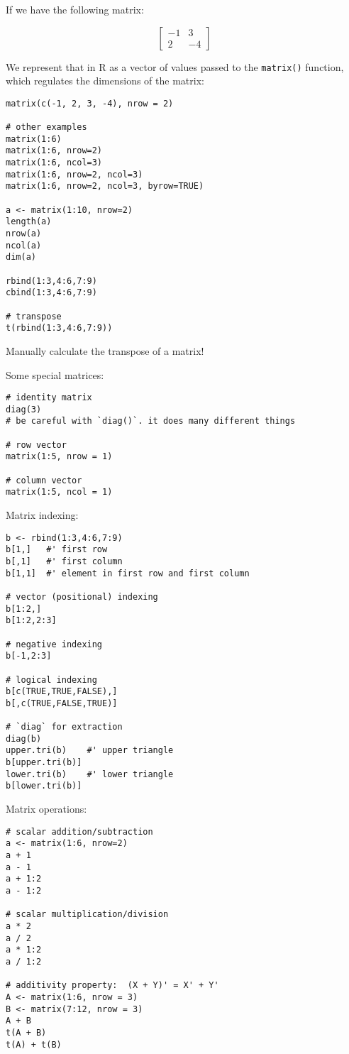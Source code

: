 \documentclass[a4paper,12pt]{article}
\begin{document}
If we have the following matrix:

\begin{equation}
\begin{bmatrix}
  -1 & 3 \\
  2 & -4
\end{bmatrix}
\end{equation}


We represent that in R as a vector of values passed to the \texttt{matrix()} function, which regulates the dimensions of the matrix:

\begin{lstlisting}
matrix(c(-1, 2, 3, -4), nrow = 2)

# other examples
matrix(1:6)
matrix(1:6, nrow=2)
matrix(1:6, ncol=3)
matrix(1:6, nrow=2, ncol=3)
matrix(1:6, nrow=2, ncol=3, byrow=TRUE)

a <- matrix(1:10, nrow=2)
length(a)
nrow(a)
ncol(a)
dim(a)

rbind(1:3,4:6,7:9)
cbind(1:3,4:6,7:9)

# transpose
t(rbind(1:3,4:6,7:9))
\end{lstlisting}

Manually calculate the transpose of a matrix!


Some special matrices:

\begin{lstlisting}
# identity matrix
diag(3)
# be careful with `diag()`. it does many different things

# row vector
matrix(1:5, nrow = 1)

# column vector
matrix(1:5, ncol = 1)
\end{lstlisting}


Matrix indexing:

\begin{lstlisting}
b <- rbind(1:3,4:6,7:9)
b[1,]	#' first row
b[,1]	#' first column
b[1,1]	#' element in first row and first column

# vector (positional) indexing
b[1:2,]
b[1:2,2:3]

# negative indexing
b[-1,2:3]

# logical indexing
b[c(TRUE,TRUE,FALSE),]
b[,c(TRUE,FALSE,TRUE)]

# `diag` for extraction
diag(b)
upper.tri(b)	#' upper triangle
b[upper.tri(b)]
lower.tri(b)	#' lower triangle
b[lower.tri(b)]
\end{lstlisting}


Matrix operations:

\begin{lstlisting}
# scalar addition/subtraction
a <- matrix(1:6, nrow=2)
a + 1
a - 1
a + 1:2
a - 1:2

# scalar multiplication/division
a * 2
a / 2
a * 1:2
a / 1:2

# additivity property:  (X + Y)' = X' + Y'
A <- matrix(1:6, nrow = 3)
B <- matrix(7:12, nrow = 3)
A + B
t(A + B)
t(A) + t(B)
\end{lstlisting}
\end{document}
